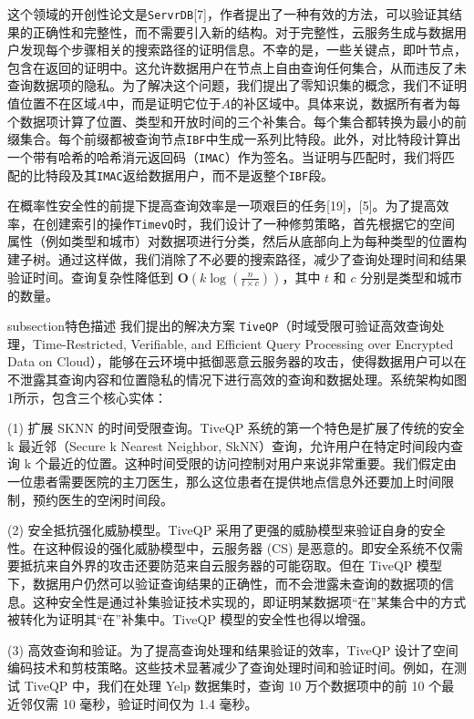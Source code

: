 \documentclass{cumcmthesis}
\numberwithin{equation}{section} %
\numberwithin{figure}{section} %
\numberwithin{table}{section} %
\begin{document}
\textbf{\bfseries{}}这个领域的开创性论文是\texttt{ServrDB}[7]，作者提出了一种有效的方法，可以验证其结果的正确性和完整性，而不需要引入新的结构。对于完整性，云服务生成与数据用户发现每个步骤相关的搜索路径的证明信息。不幸的是，一些关键点，即叶节点，包含在返回的证明中。这允许数据用户在节点上自由查询任何集合，从而违反了未查询数据项的隐私。为了解决这个问题，我们提出了零知识集的概念，我们不证明值位置不在区域\(A\)中，而是证明它位于\(A\)的补区域中。具体来说，数据所有者为每个数据项计算了位置、类型和开放时间的三个补集合。每个集合都转换为最小的前缀集合。每个前缀都被查询节点\texttt{IBF}中生成一系列比特段。此外，对比特段计算出一个带有哈希的哈希消元返回码（\texttt{IMAC}）作为签名。当证明与匹配时，我们将匹配的比特段及其\texttt{IMAC}返给数据用户，而不是返整个\texttt{IBF}段。

\textbf{\bfseries{}}在概率性安全性的前提下提高查询效率是一项艰巨的任务[19]，[5]。为了提高效率，在创建索引的操作\texttt{TimevQ}时，我们设计了一种修剪策略，首先根据它的空间属性（例如类型和城市）对数据项进行分类，然后从底部向上为每种类型的位置构建子树。通过这样做，我们消除了不必要的搜索路径，减少了查询处理时间和结果验证时间。查询复杂性降低到 $\mathbf{O}(k\log(\frac{n}{t\times c}))$，其中 $t$ 和 $c$ 分别是类型和城市的数量。

subsection{特色描述}
我们提出的解决方案 \texttt{TiveQP}（时域受限可验证高效查询处理，Time-Restricted, Verifiable, and Efficient Query Processing over Encrypted Data on Cloud），能够在云环境中抵御恶意云服务器的攻击，使得数据用户可以在不泄露其查询内容和位置隐私的情况下进行高效的查询和数据处理。系统架构如图1所示，包含三个核心实体：

(1) 扩展 SKNN 的时间受限查询。TiveQP 系统的第一个特色是扩展了传统的安全 k 最近邻（Secure k Nearest Neighbor, SkNN）查询，允许用户在特定时间段内查询 k 个最近的位置。这种时间受限的访问控制对用户来说非常重要。我们假定由一位患者需要医院的主刀医生，那么这位患者在提供地点信息外还要加上时间限制，预约医生的空闲时间段。

(2) 安全抵抗强化威胁模型。TiveQP 采用了更强的威胁模型来验证自身的安全性。在这种假设的强化威胁模型中，云服务器 (CS) 是恶意的。即安全系统不仅需要抵抗来自外界的攻击还要防范来自云服务器的可能窃取。但在 TiveQP 模型下，数据用户仍然可以验证查询结果的正确性，而不会泄露未查询的数据项的信息。这种安全性是通过补集验证技术实现的，即证明某数据项“在”某集合中的方式被转化为证明其“在”补集中。TiveQP 模型的安全性也得以增强。

(3) 高效查询和验证。为了提高查询处理和结果验证的效率，TiveQP 设计了空间编码技术和剪枝策略。这些技术显著减少了查询处理时间和验证时间。例如，在测试 TiveQP 中，我们在处理 Yelp 数据集时，查询 10 万个数据项中的前 10 个最近邻仅需 10 毫秒，验证时间仅为 1.4 毫秒。
\end{document}
